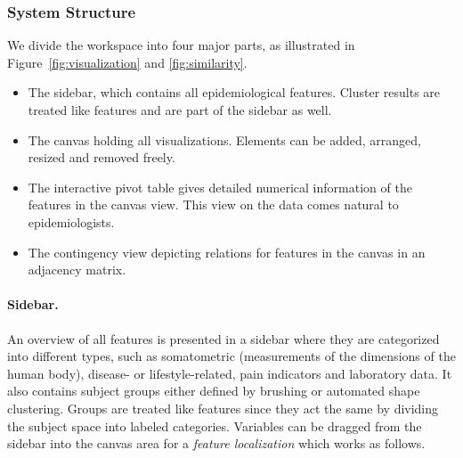 \documentclass[journal]{style/vgtc} 			          %
\begin{document}
\subsubsection{System Structure} \label{Structure and Workflow}
We divide the workspace into four major parts, as illustrated in Figure~\ref{fig:visualization} and \ref{fig:similarity}.
\begin{itemize}
	\item The sidebar, which contains all epidemiological features. Cluster results are treated like features and are part of the sidebar as well.
	\item The canvas holding all visualizations. Elements can be added, arranged, resized and removed freely.
	\item The interactive pivot table gives detailed numerical information of the features in the canvas view. This view on the data comes natural to epidemiologists.
	\item The contingency view depicting relations for features in the canvas in an adjacency matrix.
\end{itemize}
%
% 
% 

\paragraph{Sidebar.}
An overview of all features is presented in a sidebar where they are categorized into different types, such as somatometric (measurements of the dimensions of the human body), disease- or lifestyle-related, pain indicators and laboratory data.
%
It also contains subject groups either defined by brushing or automated shape clustering.
%
Groups are treated like features since they act the same by dividing the subject space into labeled categories.
%
Variables can be dragged from the sidebar into the canvas area for a \emph{feature localization} which works as follows.
%
\end{document}
